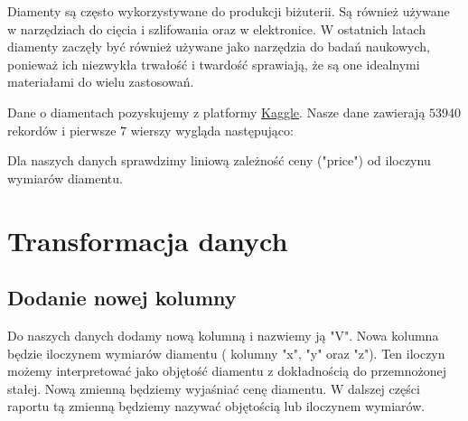 \documentclass[12pt,leqno]{article}
\theoremstyle{exer}
\begin{document}
	Diamenty są często wykorzystywane do produkcji biżuterii. Są również używane  w  narzędziach do cięcia i szlifowania oraz w elektronice. W ostatnich latach diamenty zaczęły być również używane jako narzędzia do badań naukowych, ponieważ ich niezwykła trwałość i twardość sprawiają, że są one idealnymi materiałami do wielu zastosowań.
	
	Dane o diamentach pozyskujemy z platformy \href{https://www.kaggle.com}{Kaggle}. Nasze dane zawierają $53940$ rekordów i pierwsze $7$ wierszy wygląda następująco:
	\begin{table}[H]
		\caption{Oryginalne dane }
		\label{orginalne_dane}
	\end{table}
	
	Dla naszych danych sprawdzimy liniową zależność ceny ("price") od iloczynu wymiarów diamentu.
	\section{Transformacja danych}
	
	\subsection{Dodanie nowej kolumny }
	Do naszych danych dodamy nową kolumną i nazwiemy ją "V". Nowa kolumna będzie iloczynem wymiarów diamentu ( kolumny "x", "y" oraz "z"). Ten iloczyn możemy interpretować jako objętość diamentu z dokładnością do przemnożonej stałej. Nową zmienną będziemy wyjaśniać cenę diamentu. W dalszej części raportu tą zmienną będziemy nazywać objętością lub iloczynem wymiarów.
	
\end{document}
